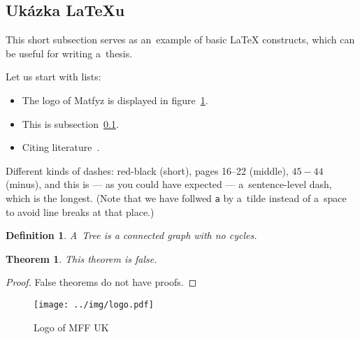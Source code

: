 
\subsection{Ukázka \LaTeX{}u}
\label{ssec:ukazka}

This short subsection serves as an~example of basic \LaTeX{} constructs,
which can be useful for writing a~thesis.

Let us start with lists:

\begin{itemize}
\item The logo of Matfyz is displayed in figure~\ref{fig:mff}.
\item This is subsection~\ref{ssec:ukazka}.
\item Citing literature~\cite{lamport94}.
\end{itemize}

Different kinds of dashes:
red-black (short),
pages 16--22 (middle),
$45-44$ (minus),
and this is --- as you could have expected --- a~sentence-level dash,
which is the longest.
(Note that we have follwed \verb|a| by a~tilde instead of a~space
to avoid line breaks at that place.)

\newtheorem{theorem}{Theorem}
\newtheorem*{define}{Definition}	%

\begin{define}
A~{\sl Tree} is a connected graph with no cycles.
\end{define}

\begin{theorem}
This theorem is false.
\end{theorem}

\begin{proof}
False theorems do not have proofs.
\end{proof}

\begin{figure}
	\centering
	\texttt{[image: ../img/logo.pdf]}
	\caption{Logo of MFF UK}
	\label{fig:mff}
\end{figure}
